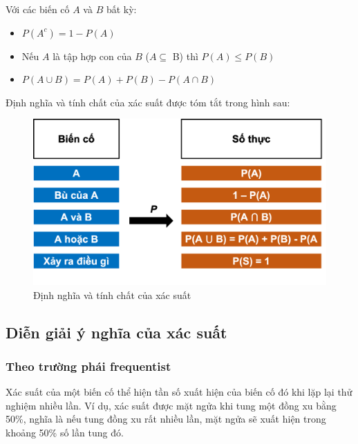 \documentclass[
]{book}
\providecommand{\tightlist}{%
  \setlength{\itemsep}{0pt}\setlength{\parskip}{0pt}}
\begin{document}
Với các biến cố \(A\) và \(B\) bất kỳ:

\begin{itemize}
\tightlist
\item
  \(P(A^c) = 1 - P(A)\)
\item
  Nếu \(A\) là tập hợp con của \(B\) (\(A \subseteq\) B) thì \(P(A) \leq P(B)\)
\item
  \(P(A \cup B) = P(A) + P(B) - P(A \cap B)\)
\end{itemize}

Định nghĩa và tính chất của xác suất được tóm tắt trong hình sau:

\begin{figure}

{\centering \includegraphics[width=1\linewidth]{figures/Picture05} 

}

\caption{Định nghĩa và tính chất của xác suất}\label{fig:generaldefinition}
\end{figure}

\hypertarget{diux1ec5n-giux1ea3i-uxfd-nghux129a-cux1ee7a-xuxe1c-suux1ea5t}{%
\subsection{Diễn giải ý nghĩa của xác suất}\label{diux1ec5n-giux1ea3i-uxfd-nghux129a-cux1ee7a-xuxe1c-suux1ea5t}}

\hypertarget{theo-trux1b0ux1eddng-phuxe1i-frequentist}{%
\subsubsection{Theo trường phái frequentist}\label{theo-trux1b0ux1eddng-phuxe1i-frequentist}}

Xác suất của một biến cố thể hiện tần số xuất hiện của biến cố đó khi lặp lại thử nghiệm nhiều lần. Ví dụ, xác suất được mặt ngửa khi tung một đồng xu bằng 50\%, nghĩa là nếu tung đồng xu rất nhiều lần, mặt ngửa sẽ xuất hiện trong khoảng 50\% số lần tung đó.
\end{document}
